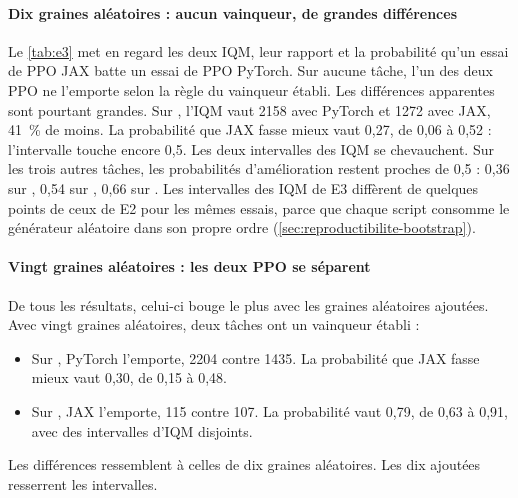\paragraph{Dix graines aléatoires : aucun vainqueur, de grandes différences}
Le \cref{tab:e3} met en regard les deux IQM, leur rapport et la probabilité qu'un essai de PPO JAX batte un
essai de PPO PyTorch. Sur aucune tâche, l'un des deux PPO ne l'emporte selon la règle du vainqueur établi. Les
différences apparentes sont pourtant grandes. Sur , l'IQM vaut \num{2158} avec PyTorch et \num{1272}
avec JAX, 41~\% de moins. La probabilité que JAX fasse mieux vaut 0,27, de 0,06 à 0,52 : l'intervalle touche
encore 0,5. Les deux intervalles des IQM se chevauchent. Sur les trois autres tâches, les probabilités
d'amélioration restent proches de 0,5 : 0,36 sur , 0,54 sur , 0,66 sur
. Les intervalles des IQM de E3 diffèrent de quelques points de ceux de E2 pour les
mêmes essais, parce que chaque script consomme le générateur aléatoire dans son propre
ordre (\cref{sec:reproductibilite-bootstrap}).


\paragraph{Vingt graines aléatoires : les deux PPO se séparent}
De tous les résultats, celui-ci bouge le plus avec les graines aléatoires ajoutées. Avec vingt graines
aléatoires, deux tâches ont un vainqueur établi :
\begin{itemize}
  \item Sur , PyTorch l'emporte, \num{2204} contre \num{1435}. La probabilité que JAX fasse
    mieux vaut 0,30, de 0,15 à 0,48.
  \item Sur , JAX l'emporte, 115 contre 107. La probabilité vaut 0,79, de 0,63 à 0,91, avec des
    intervalles d'IQM disjoints.
\end{itemize}
Les différences ressemblent à celles de dix graines aléatoires. Les dix ajoutées resserrent les intervalles.


